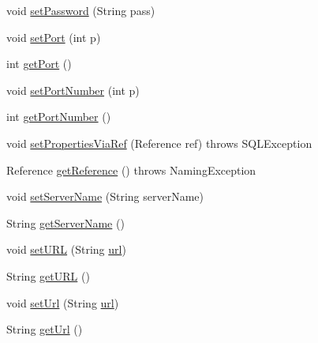 \begin{DoxyCompactItemize}
\item 
void \mbox{\hyperlink{classcom_1_1mysql_1_1cj_1_1jdbc_1_1_mysql_data_source_aba660c9f74325976f0a4b217f833f163}{set\+Password}} (String pass)
\item 
void \mbox{\hyperlink{classcom_1_1mysql_1_1cj_1_1jdbc_1_1_mysql_data_source_a008a1d301424119b5820fa8e3acd1ce7}{set\+Port}} (int p)
\item 
int \mbox{\hyperlink{classcom_1_1mysql_1_1cj_1_1jdbc_1_1_mysql_data_source_a45dddaf76537f2f708c6790e348369fa}{get\+Port}} ()
\item 
void \mbox{\hyperlink{classcom_1_1mysql_1_1cj_1_1jdbc_1_1_mysql_data_source_ac67d0eda45968c9dd12c4ea7241cead1}{set\+Port\+Number}} (int p)
\item 
int \mbox{\hyperlink{classcom_1_1mysql_1_1cj_1_1jdbc_1_1_mysql_data_source_a59aae6b9598f9021a0c676f237ddf465}{get\+Port\+Number}} ()
\item 
void \mbox{\hyperlink{classcom_1_1mysql_1_1cj_1_1jdbc_1_1_mysql_data_source_a5b168678c34fa8a4d27c480e78a2cab7}{set\+Properties\+Via\+Ref}} (Reference ref)  throws S\+Q\+L\+Exception 
\item 
Reference \mbox{\hyperlink{classcom_1_1mysql_1_1cj_1_1jdbc_1_1_mysql_data_source_a6acbbcd3dfbb948cf5231d2bd0a58928}{get\+Reference}} ()  throws Naming\+Exception 
\item 
void \mbox{\hyperlink{classcom_1_1mysql_1_1cj_1_1jdbc_1_1_mysql_data_source_ab8d27cf5e8488999237c5ee21f56803e}{set\+Server\+Name}} (String server\+Name)
\item 
String \mbox{\hyperlink{classcom_1_1mysql_1_1cj_1_1jdbc_1_1_mysql_data_source_acca69f2259888471ef39586befb8ec61}{get\+Server\+Name}} ()
\item 
void \mbox{\hyperlink{classcom_1_1mysql_1_1cj_1_1jdbc_1_1_mysql_data_source_a03d52b5b48fb303375e5c1b35b7f52f9}{set\+U\+RL}} (String \mbox{\hyperlink{classcom_1_1mysql_1_1cj_1_1jdbc_1_1_mysql_data_source_a3e7b4dc2d4ae64f960ee5970a60112b3}{url}})
\item 
String \mbox{\hyperlink{classcom_1_1mysql_1_1cj_1_1jdbc_1_1_mysql_data_source_aa623564ec5fb8ced6d39d8cd441b70bb}{get\+U\+RL}} ()
\item 
void \mbox{\hyperlink{classcom_1_1mysql_1_1cj_1_1jdbc_1_1_mysql_data_source_adefc4cd844fa0cae59fcf49163692e4e}{set\+Url}} (String \mbox{\hyperlink{classcom_1_1mysql_1_1cj_1_1jdbc_1_1_mysql_data_source_a3e7b4dc2d4ae64f960ee5970a60112b3}{url}})
\item 
String \mbox{\hyperlink{classcom_1_1mysql_1_1cj_1_1jdbc_1_1_mysql_data_source_a5baa5243975b05f88cdb631c88a60185}{get\+Url}} ()

\end{DoxyCompactItemize}
